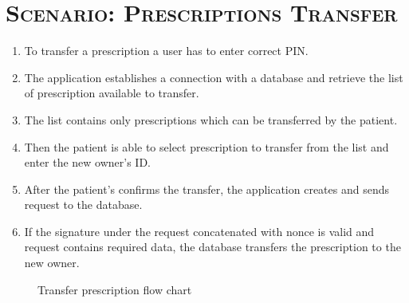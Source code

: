 \section{\textsc{Scenario: Prescriptions Transfer}}
\begin{enumerate}
\item To transfer a prescription a user has to enter correct PIN. 
\item The application establishes a connection with a database and retrieve the list of prescription available to transfer. 
\item The list contains only prescriptions which can be transferred by the patient. 
\item Then the patient is able to select prescription to transfer from the list and enter the new owner's ID. 
\item After the patient's confirms the transfer, the application creates and sends request to the database. 
\item If the signature under the request concatenated with nonce is valid and request contains required data, the database transfers the prescription to the new owner.
\end{enumerate}
\begin{figure}[h]
\centering
 \hspace*{-0.4in}
\caption{Transfer prescription flow chart}
\end{figure}



